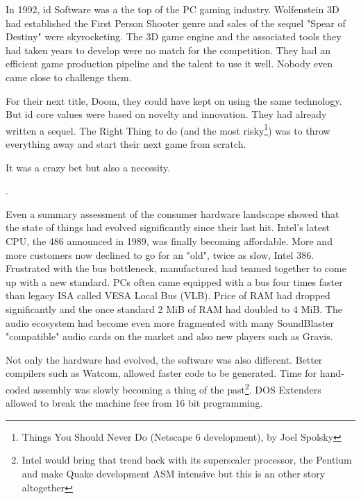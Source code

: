 In 1992, id Software was a the top of the PC gaming industry. Wolfenstein 3D had established the First
Person Shooter genre and sales of the sequel "Spear of Destiny" were skyrocketing. The 3D game engine and the associated 
tools they had taken years to develop were no match for the competition. They had an efficient game production pipeline and the talent to use it well. Nobody even came close to challenge them.\\
\par
For their next title, Doom, they could have kept on using the same technology. But id core values were based on novelty and innovation. They had already written a sequel. The Right Thing to do (and the most risky\footnote{Things You Should Never Do (Netscape 6 development), by Joel Spolsky}) was to throw everything away and start their next game from scratch.\\
\par
It was a crazy bet but also a necessity.\\
\par
{}. \\
\par
Even a summary assessment of the consumer hardware landscape showed that the state of things had evolved significantly since their last hit. Intel's latest CPU, the 486 announced in 1989, was finally becoming affordable. More and more customers now declined to go for an "old", twice as slow, Intel 386. Frustrated with the bus bottleneck, manufactured had teamed together to come up with a new standard. PCs often came equipped with a bus four times faster than legacy ISA called VESA Local Bus (VLB). Price of RAM had dropped significantly and the once standard 2 MiB of RAM had doubled to 4 MiB. The audio ecosystem had become even more fragmented with many SoundBlaster "compatible" audio cards on the market and also new players such as Gravis.\\
 \par 
 Not only the hardware had evolved, the software was also different. Better compilers such as Watcom, allowed faster code to be generated. Time for hand-coded assembly was slowly becoming a thing of the past\footnote{Intel would bring that trend back with its superscaler processor, the Pentium and make Quake development ASM intensive but this is an other story altogether}. DOS Extenders allowed to break the machine free from 16 bit programming.\\

